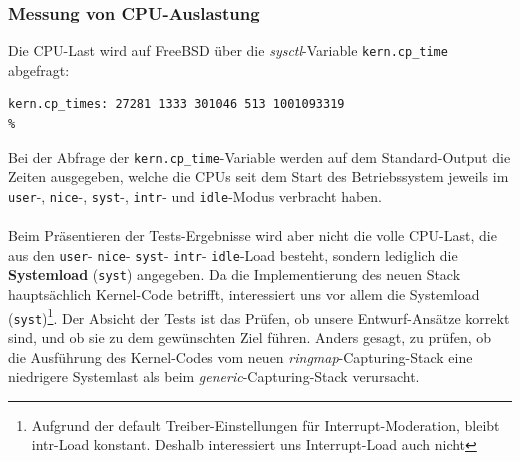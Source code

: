 \subsubsection*{Messung von CPU-Auslastung}
Die CPU-Last wird auf FreeBSD über die \emph{sysctl}-Variable
\lstset{language=bash} \verb+kern.cp_time+ abgefragt:
\begin{lstlisting}[captionpos={b}, frame=single]
% sysctl kern.cp_time
kern.cp_times: 27281 1333 301046 513 1001093319
%
\end{lstlisting}
Bei der Abfrage der \verb+kern.cp_time+-Variable werden auf dem Standard-Output die Zeiten
ausgegeben, welche die CPUs seit dem Start des Betriebssystem jeweils im \verb+user+-,  
\verb+nice+-, \verb+syst+-, \verb+intr+- und \verb+idle+-Modus verbracht
haben.\\\\
Beim Präsentieren der Tests-Ergebnisse wird aber nicht die volle CPU-Last, die
aus den \verb+user+- \verb+nice+- \verb+syst+- \verb+intr+- \verb+idle+-Load
besteht, sondern lediglich die \textbf{Systemload} (\verb+syst+) angegeben.  Da
die Implementierung des neuen Stack hauptsächlich Kernel-Code betrifft,
interessiert uns vor allem die Systemload (\verb+syst+)\footnote{Aufgrund der
default Treiber-Einstellungen für Interrupt-Moderation, bleibt intr-Load
konstant. Deshalb interessiert uns Interrupt-Load auch nicht}.  Der Absicht der
Tests ist das Prüfen, ob unsere Entwurf-Ansätze korrekt sind, und ob sie zu dem
gewünschten Ziel führen. Anders gesagt, zu prüfen, ob die Ausführung des
Kernel-Codes vom neuen \emph{ringmap}-Capturing-Stack eine niedrigere
Systemlast als beim \emph{generic}-Capturing-Stack verursacht.
%
